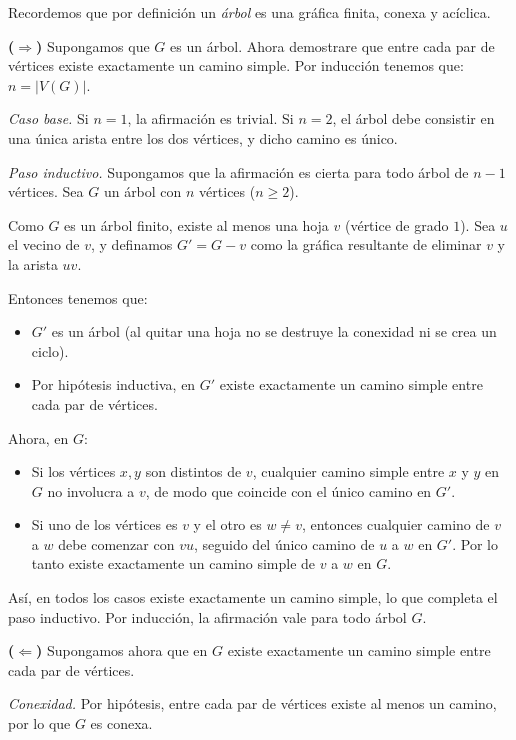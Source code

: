 \documentclass[12pt]{article}
\begin{document}
Recordemos que por definición un \emph{árbol} es una gráfica finita, conexa y acíclica.

\textbf{($\Rightarrow$)} 
Supongamos que $G$ es un árbol. Ahora demostrare que entre cada par de vértices existe exactamente un camino simple. 
Por inducción tenemos que: $n = |V(G)|$.

\emph{Caso base.}  
Si $n=1$, la afirmación es trivial.  
Si $n=2$, el árbol debe consistir en una única arista entre los dos vértices, y dicho camino es único.

\emph{Paso inductivo.}  
Supongamos que la afirmación es cierta para todo árbol de $n-1$ vértices. Sea $G$ un árbol con $n$ vértices ($n \geq 2$).  

Como $G$ es un árbol finito, existe al menos una hoja $v$ (vértice de grado $1$). Sea $u$ el vecino de $v$, y definamos $G' = G - v$ como la gráfica resultante de eliminar $v$ y la arista $uv$.  

Entonces tenemos que: 
\begin{itemize}
    \item $G'$ es un árbol (al quitar una hoja no se destruye la conexidad ni se crea un ciclo).
    \item Por hipótesis inductiva, en $G'$ existe exactamente un camino simple entre cada par de vértices.
\end{itemize}

Ahora, en $G$:
\begin{itemize}
    \item Si los vértices $x,y$ son distintos de $v$, cualquier camino simple entre $x$ y $y$ en $G$ no involucra a $v$, de modo que coincide con el único camino en $G'$.
    \item Si uno de los vértices es $v$ y el otro es $w \neq v$, entonces cualquier camino de $v$ a $w$ debe comenzar con $v u$, seguido del único camino de $u$ a $w$ en $G'$. Por lo tanto existe exactamente un camino simple de $v$ a $w$ en $G$.
\end{itemize}

Así, en todos los casos existe exactamente un camino simple, lo que completa el paso inductivo.  
Por inducción, la afirmación vale para todo árbol $G$.

\bigskip
\textbf{($\Leftarrow$)}  
Supongamos ahora que en $G$ existe exactamente un camino simple entre cada par de vértices.  

\emph{Conexidad.} Por hipótesis, entre cada par de vértices existe al menos un camino, por lo que $G$ es conexa.
\end{document}
